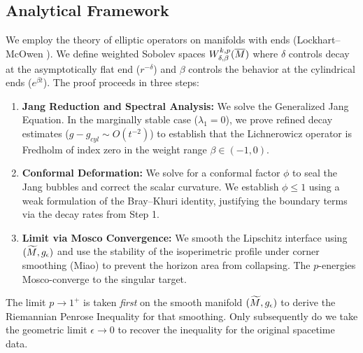 \subsection{Analytical Framework}
We employ the theory of elliptic operators on manifolds with ends (Lockhart--McOwen \cite{lockhartmccowen1985}). We define weighted Sobolev spaces $W^{k,p}_{\delta, \beta}(\overline{M})$ where $\delta$ controls decay at the asymptotically flat end ($r^{-\delta}$) and $\beta$ controls the behavior at the cylindrical ends ($e^{\beta t}$).
The proof proceeds in three steps:
\begin{enumerate}
    \item \textbf{Jang Reduction and Spectral Analysis:} We solve the Generalized Jang Equation. In the marginally stable case ($\lambda_1=0$), we prove refined decay estimates ($g - g_{cyl} \sim O(t^{-2})$) to establish that the Lichnerowicz operator is Fredholm of index zero in the weight range $\beta \in (-1, 0)$.
    \item \textbf{Conformal Deformation:} We solve for a conformal factor $\phi$ to seal the Jang bubbles and correct the scalar curvature. We establish $\phi \le 1$ using a weak formulation of the Bray--Khuri identity, justifying the boundary terms via the decay rates from Step 1.
    \item \textbf{Limit via Mosco Convergence:} We smooth the Lipschitz interface using $(\widetilde{M}, g_{\epsilon})$ and use the stability of the isoperimetric profile under corner smoothing (Miao) to prevent the horizon area from collapsing. The $p$-energies Mosco-converge to the singular target.
\end{enumerate}

The limit $p \to 1^+$ is taken \emph{first} on the smooth manifold $(\widetilde{M}, g_{\epsilon})$ to derive the Riemannian Penrose Inequality for that smoothing. Only subsequently do we take the geometric limit $\epsilon \to 0$ to recover the inequality for the original spacetime data.

